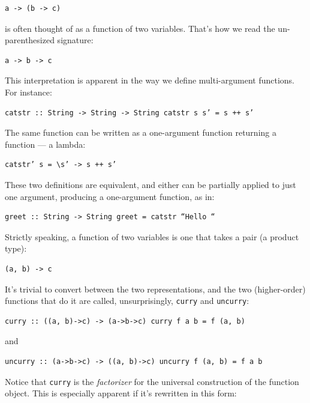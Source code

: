 \begin{verbatim}
a -> (b -> c)
\end{verbatim}

is often thought of as a function of two variables. That's how we read
the un-parenthesized signature:

\begin{verbatim}
a -> b -> c
\end{verbatim}

This interpretation is apparent in the way we define multi-argument
functions. For instance:

\begin{verbatim}
catstr :: String -> String -> String catstr s s’ = s ++ s’
\end{verbatim}

The same function can be written as a one-argument function returning a
function --- a lambda:

\begin{verbatim}
catstr’ s = \s’ -> s ++ s’
\end{verbatim}

These two definitions are equivalent, and either can be partially
applied to just one argument, producing a one-argument function, as in:

\begin{verbatim}
greet :: String -> String greet = catstr “Hello “
\end{verbatim}

Strictly speaking, a function of two variables is one that takes a pair
(a product type):

\begin{verbatim}
(a, b) -> c
\end{verbatim}

It's trivial to convert between the two representations, and the two
(higher-order) functions that do it are called, unsurprisingly,
\texttt{curry} and \texttt{uncurry}:

\begin{verbatim}
curry :: ((a, b)->c) -> (a->b->c) curry f a b = f (a, b)
\end{verbatim}

and

\begin{verbatim}
uncurry :: (a->b->c) -> ((a, b)->c) uncurry f (a, b) = f a b
\end{verbatim}

Notice that \texttt{curry} is the \emph{factorizer} for the universal
construction of the function object. This is especially apparent if it's
rewritten in this form:

